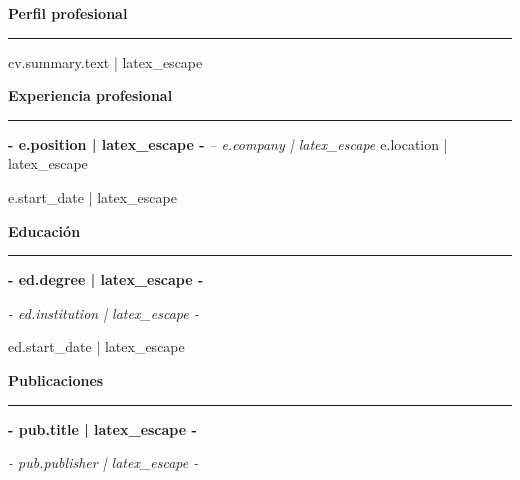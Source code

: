 \documentclass[11pt,a4paper]{article}
\newcommand{\cvsection}[1]{%
  \vspace{8pt}\par\noindent\textbf{\large #1}\par
  \vspace{2pt}\noindent\rule{\linewidth}{0.4pt}\par
  \vspace{4pt}
}%
\begin{document}
{%
\cvsection{Perfil profesional}
{{ cv.summary.text | latex_escape }}
{%

{%
\cvsection{Experiencia profesional}
{%
\noindent\textbf{ {{- e.position | latex_escape -}} }\textit{ -- {{ e.company | latex_escape }} }
{\small {{ e.location | latex_escape }} }\\
{%
{\small {{ e.start_date | latex_escape }}{%
{%
{%
{%
\vspace{4pt}
{%
{%

{%
\cvsection{Educación}
{%
\noindent\textbf{ {{- ed.degree | latex_escape -}} }{%
{\small \textit{ {{- ed.institution | latex_escape -}} } }\\
{%
{\small {{ ed.start_date | latex_escape }}{%
{%
{%
\vspace{4pt}
{%
{%

{%
\cvsection{Publicaciones}
{%
\noindent\textbf{ {{- pub.title | latex_escape -}} }\\
{%
{\small \textit{ {{- pub.publisher | latex_escape -}} }{%
{%
{%
{%
\vspace{4pt}
{%
{%

}}}}}}}}}}}}}}}}}}}}}}}}}}}}}}}}
\end{document}
